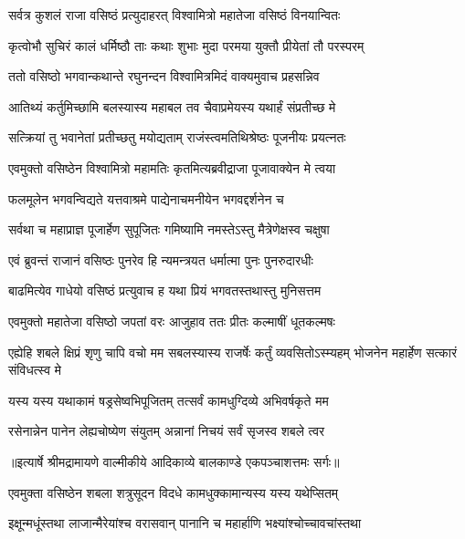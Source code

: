 \twolineshloka
{सर्वत्र कुशलं राजा वसिष्ठं प्रत्युदाहरत्}
{विश्वामित्रो महातेजा वसिष्ठं विनयान्वितः} %

\twolineshloka
{कृत्वोभौ सुचिरं कालं धर्मिष्ठौ ताः कथाः शुभाः}
{मुदा परमया युक्तौ प्रीयेतां तौ परस्परम्} %

\twolineshloka
{ततो वसिष्ठो भगवान्कथान्ते रघुनन्दन}
{विश्वामित्रमिदं वाक्यमुवाच प्रहसन्निव} %

\twolineshloka
{आतिथ्यं कर्तुमिच्छामि बलस्यास्य महाबल}
{तव चैवाप्रमेयस्य यथार्हं संप्रतीच्छ मे} %

\twolineshloka
{सत्क्रियां तु भवानेतां प्रतीच्छतु मयोद्यताम्}
{राजंस्त्वमतिथिश्रेष्ठः पूजनीयः प्रयत्नतः} %

\twolineshloka
{एवमुक्तो वसिष्ठेन विश्वामित्रो महामतिः}
{कृतमित्यब्रवीद्राजा पूजावाक्येन मे त्वया} %

\twolineshloka
{फलमूलेन भगवन्विद्यते यत्तवाश्रमे}
{पाद्येनाचमनीयेन भगवद्दर्शनेन च} %

\twolineshloka
{सर्वथा च महाप्राज्ञ पूजार्हेण सुपूजितः}
{गमिष्यामि नमस्तेऽस्तु मैत्रेणेक्षस्व चक्षुषा} %

\twolineshloka
{एवं ब्रुवन्तं राजानं वसिष्ठः पुनरेव हि}
{न्यमन्त्रयत धर्मात्मा पुनः पुनरुदारधीः} %

\twolineshloka
{बाढमित्येव गाधेयो वसिष्ठं प्रत्युवाच ह}
{यथा प्रियं भगवतस्तथास्तु मुनिसत्तम} %

\twolineshloka
{एवमुक्तो महातेजा वसिष्ठो जपतां वरः}
{आजुहाव ततः प्रीतः कल्माषीं धूतकल्मषः} %

\threelineshloka
{एह्येहि शबले क्षिप्रं शृणु चापि वचो मम}
{सबलस्यास्य राजर्षेः कर्तुं व्यवसितोऽस्म्यहम्}
{भोजनेन महार्हेण सत्कारं संविधत्स्व मे} %

\twolineshloka
{यस्य यस्य यथाकामं षड्रसेष्वभिपूजितम्}
{तत्सर्वं कामधुग्दिव्ये अभिवर्षकृते मम} %

\twolineshloka
{रसेनान्नेन पानेन लेह्यचोष्येण संयुतम्}
{अन्नानां निचयं सर्वं सृजस्व शबले त्वर} %


{॥इत्यार्षे श्रीमद्रामायणे वाल्मीकीये आदिकाव्ये बालकाण्डे एकपञ्चाशत्तमः सर्गः॥}


\twolineshloka
{एवमुक्ता वसिष्ठेन शबला शत्रुसूदन}
{विदधे कामधुक्कामान्यस्य यस्य यथेप्सितम्} %

\twolineshloka
{इक्षून्मधूंस्तथा लाजान्मैरेयांश्च वरासवान्}
{पानानि च महार्हाणि भक्ष्यांश्चोच्चावचांस्तथा} %

